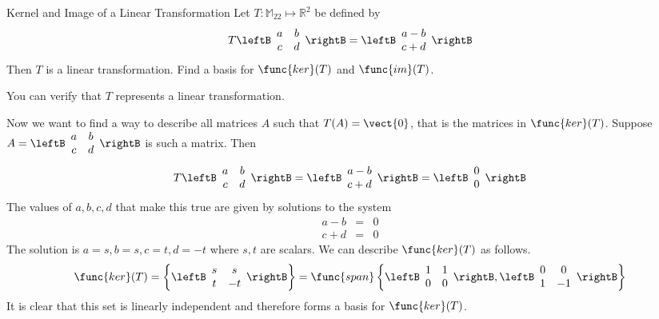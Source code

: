\begin{example}{Kernel and Image of a Linear Transformation}\label{exa:findingkernelimage}
Let $T: \mathbb{M}_{22} \mapsto \mathbb{R}^2$ be defined by
\[
T \leftB \begin{array}{cc}
a & b \\
c & d 
\end{array}
\rightB
 = 
\leftB
\begin{array}{c}
a - b \\
c + d
\end{array}
\rightB
\]
Then $T$ is a linear transformation. Find a basis for $\func{ker} (T)$ and $\func{im}(T)$.
\end{example}

\begin{solution}
You can verify that $T$ represents a linear transformation. 

Now we want to find a way to describe all matrices $A$ such that $T(A) = \vect{0}$, that is the matrices in $\func{ker}(T)$. 
Suppose $A = \leftB \begin{array}{cc}
a & b \\
c & d 
\end{array}
\rightB$ is such a matrix. 
Then
\[
T \leftB \begin{array}{cc}
a & b \\
c & d 
\end{array}
\rightB
 = 
\leftB
\begin{array}{c}
a - b \\
c + d
\end{array}
\rightB
 = 
\leftB
\begin{array}{c}
0 \\
0
\end{array}
\rightB
\]
The values of $a, b, c, d$ that make this true are given by solutions to the system
\begin{eqnarray*}
a - b &=& 0 \\
c + d &=& 0 
\end{eqnarray*}
The solution is $a = s, b = s, c = t, d = -t$ where $s, t$ are scalars. We can describe $\func{ker}(T)$ as follows.
\[
\func{ker}(T) = 
\left\{ 
\leftB \begin{array}{cc}
s & s \\
t & -t 
\end{array}
\rightB
\right\}
=
\func{span}
\left\{
\leftB \begin{array}{cc}
1 & 1 \\
0 & 0 
\end{array} \rightB, 
\leftB \begin{array}{cc}
0 & 0 \\
1 & -1 
\end{array} \rightB
\right\}
\]
It is clear that this set is linearly independent and therefore forms a basis for $\func{ker}(T)$. 


\end{solution}
